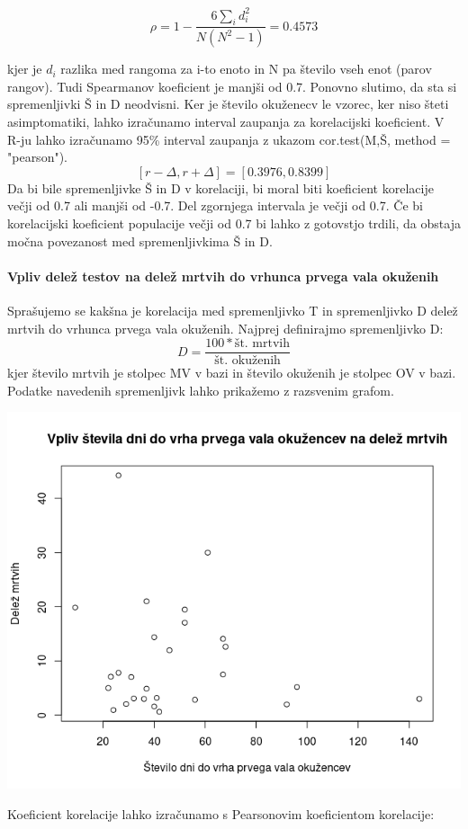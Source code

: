 \documentclass[a4paper,11pt]{article}
\begin{document}
\begin{center}
\[\rho = 1 - \frac{6\sum_{i}{}d_i^2}{N(N^2 - 1)} = 0.4573\]
\end{center}

kjer je \( d_i \) razlika med rangoma za i-to enoto in N pa število vseh enot (parov rangov). Tudi Spearmanov koeficient je manjši od 0.7. Ponovno slutimo, da sta si spremenljivki Š in D neodvisni.
Ker je število okuženecv le vzorec, ker niso šteti asimptomatiki, lahko izračunamo interval zaupanja za korelacijski koeficient. V R-ju lahko izračunamo 95\% interval zaupanja z ukazom cor.test(M,Š, method = "pearson").
\[[r - \Delta, r + \Delta] = [0.3976, 0.8399]\]
Da bi bile spremenljivke Š in D v korelaciji, bi moral biti koeficient korelacije večji od 0.7 ali manjši od -0.7. Del zgornjega intervala je večji od 0.7. Če bi korelacijski koeficient populacije večji od 0.7 bi lahko z gotovstjo trdili, da obstaja močna povezanost med spremenljivkima Š in D.

\paragraph{Vpliv delež testov na delež mrtvih do vrhunca prvega vala okuženih}
Sprašujemo se kakšna je korelacija med spremenljivko T in spremenljivko D delež mrtvih do vrhunca prvega vala okuženih. Najprej definirajmo spremenljivko D:
\[D = \frac{100 * \text{št. mrtvih}}{\text{št. okuženih}}\]
kjer število mrtvih je stolpec MV v bazi in število okuženih je stolpec OV v bazi. Podatke navedenih spremenljivk lahko prikažemo z razsvenim grafom.
\\
\begin{center}
\includegraphics[scale=0.6]{vpliv_stevila_dni_do_peaka_okuzencev_na_fatalnost}\\
\end{center}
Koeficient korelacije lahko izračunamo s Pearsonovim koeficientom korelacije:
\end{document}
